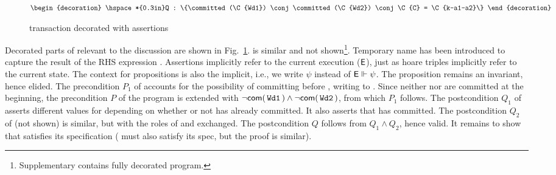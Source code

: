 \begin{figure}
\begin{txnimpcode}
$\begin{decoration}
  \hspace*{0.3in}Q : \{\committed(\C{Wd1}) \conj \committed(\C{Wd2}) \conj
                          \C{C} = \C{k-a1-a2}\}
\end{decoration}$
\end{txnimpcode}

\caption{ transaction decorated with assertions}
\label{fig:wd1-decorated}
\end{figure}

Decorated parts of  relevant to the discussion are shown in
Fig.~\ref{fig:wd1-decorated}.   is similar and not
shown\footnote{Supplementary contains fully decorated program.}.
Temporary name  has been introduced to capture the result of the
RHS expression .  Assertions implicitly refer to the current
execution ($\textsf{E}$), just as hoare triples implicitly refer to the
current state.  The context for propositions is also the implicit,
i.e., we write $\psi$ instead of $\textsf{E} \Vdash \psi$. The proposition  remains an invariant, hence elided. The precondition
$P_1$ of  accounts for the possibility of  committing
before , writing  to . Since neither  nor
 are committed at the beginning, the precondition $P$ of the
program is extended with $\neg\textsf{com}(\,{\tt Wd1}\,) \wedge
\neg\textsf{com}(\,{\tt Wd2}\,)$, from which $P_1$ follows. The postcondition
$Q_1$ of  asserts different values for  depending on
whether or not  has already committed.  It also asserts that
 has committed. The postcondition $Q_2$ of  (not shown)
is similar, but with the roles of  and  exchanged. The
postcondition $Q$ follows from $Q_1 \wedge Q_2$, hence valid. It
remains to show that  satisfies its specification ( must
also satisfy its spec, but the proof is similar).

